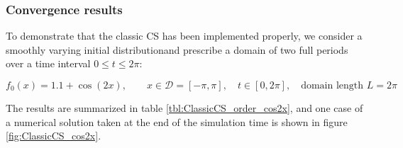 \documentclass[11pt,titlepage]{report}
\begin{document}
\subsubsection{Convergence results}

To demonstrate that the classic CS has been implemented properly, we consider a smoothly varying initial distributionand prescribe a domain of two full periods over a time interval $0 \leq t \leq 2\pi$:

\begin{equation}f_0(x) = 1.1 + \cos(2x), \qquad x\in\mathcal{D} = [-\pi, \pi], \quad t\in [0,2\pi], \quad \text{domain length } L = 2\pi \label{eq:cosine_2x}\end{equation}

\noindent The results are summarized in table \ref{tbl:ClassicCS_order_cos2x}, and one case of a numerical solution taken at the end of the simulation time is shown in figure \ref{fig:ClassicCS_cos2x}.
\end{document}
